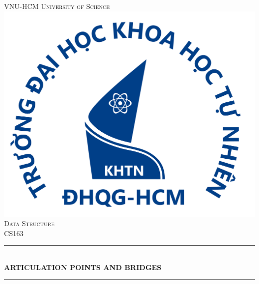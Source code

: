 \documentclass{article}
\begin{document}
\begin{titlepage}

\newcommand{\HRule}{\rule{\linewidth}{0.5mm}} %

\center %
 

\textsc{\LARGE VNU-HCM University of Science}\\[1.5cm] %
\includegraphics[scale=.1]{logo.png}\\[1cm] %
\textsc{\Large Data Structure}\\[0.5cm] %
\textsc{\large CS163}\\[0.5cm] %


\HRule \\[0.4cm]
{ \huge \bfseries \uppercase{Articulation Points and Bridges}}\\[0.4cm] %
\HRule \\[1.5cm]
 

\end{titlepage}
\end{document}

